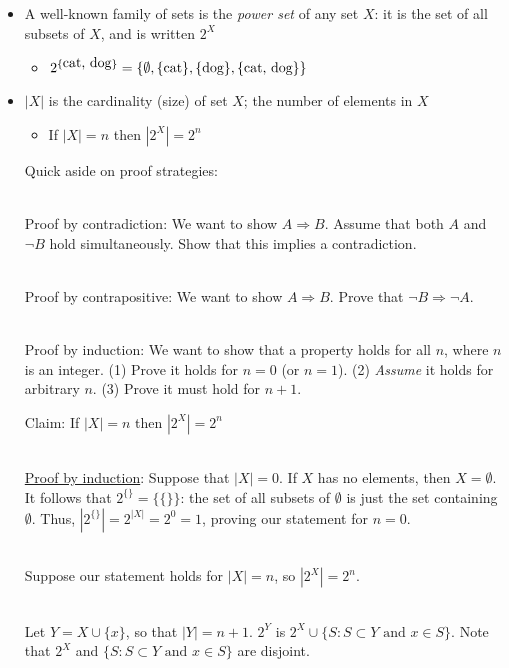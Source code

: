 \documentclass[10pt]{seminar}
\begin{document}
\begin{slide}
\begin{itemize}
\begin{itemize}
\item $\{\{1, 2, 4\}, \{2, 6\}, \{\hbox{green}\}\}$
\end{itemize}
\item A well-known family of sets is the \textit{power set} of any set $X$: it is the set of all subsets of $X$, and is written $2^X$ 
\begin{itemize}
\item $2^{\{\hbox{cat, dog}\}}=\{\emptyset, \{\hbox{cat}\}, \{\hbox{dog}\}, \{\hbox{cat, dog}\}\}$
\end{itemize}
\item $|X|$ is the cardinality (size) of set $X$; the number of elements in $X$
\begin{itemize}
\item If $|X|=n$ then $|2^X|=2^n$

\end{itemize}

\newslide
Quick aside on proof strategies:

\ \\Proof by contradiction: We want to show $A\Rightarrow B$.  Assume that both $A$ and $\neg B$ hold simultaneously.  Show that this implies a contradiction.

\ \\Proof by contrapositive: We want to show $A\Rightarrow B$.  Prove that $\neg B \Rightarrow \neg A$.

\ \\Proof by induction: We want to show that a property holds for all $n$, where $n$ is an integer.  (1) Prove it holds for $n=0$ (or $n=1$).  (2) \textit{Assume} it holds for arbitrary $n$.  (3) Prove it must hold for $n+1$.

\newslide



Claim:  If $|X|=n$ then $|2^X|=2^n$

\ \\\underline{Proof by induction}: Suppose that $|X|=0$.  If $X$ has no elements, then $X=\emptyset$. It follows that  $2^{\{\}}=\{\{\}\}$: the set of all subsets of $\emptyset$ is just the set containing $\emptyset$.  Thus, $|2^{\{\}}|=2^{|X|}=2^0=1$, proving our statement for $n=0$.

\ \\Suppose our statement holds for $|X|=n$, so $|2^X|=2^n$.  

\ \\Let $Y=X\cup \{x\}$, so that $|Y|=n+1$.  $2^Y$ is $2^X\cup\{S: S\subset Y \text{ and } x\in S\}$.  Note that $2^X$ and $\{S: S\subset Y \text{ and } x\in S\}$ are disjoint.


\end{itemize}
\end{slide}
\end{document}
